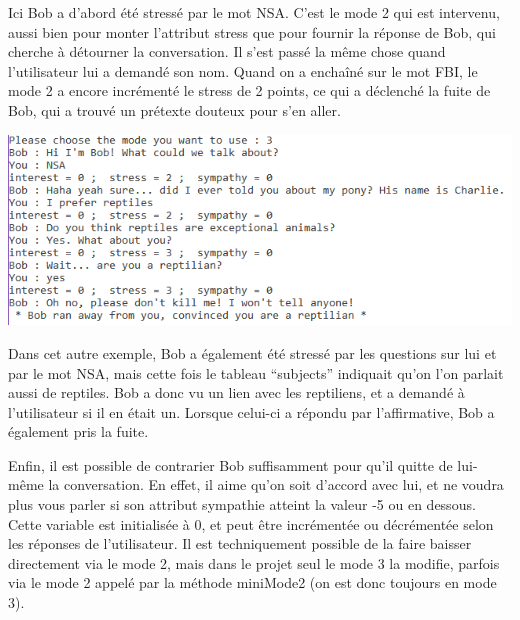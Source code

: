 \documentclass[paper=a4, 12pt]{report}
\begin{document}
\vspace{0.5cm}

Ici Bob a d’abord été stressé par le mot NSA. C’est le mode 2 qui est intervenu, aussi bien pour monter l’attribut stress que pour fournir la réponse de Bob, qui cherche à détourner la conversation. Il s’est passé la même chose quand l’utilisateur lui a demandé son nom. Quand on a enchaîné sur le mot FBI, le mode 2 a encore incrémenté le stress de 2 points, ce qui a déclenché la fuite de Bob, qui a trouvé un prétexte douteux pour s’en aller.

\vspace{0.5cm}

\includegraphics[scale=0.5]{screen4.png}

\vspace{0.5cm}

Dans cet autre exemple, Bob a également été stressé par les questions sur lui et par le mot NSA, mais cette fois le tableau “subjects” indiquait qu’on l’on parlait aussi de reptiles. Bob a donc vu un lien avec les reptiliens, et a demandé à l’utilisateur si il en était un. Lorsque celui-ci a répondu par l’affirmative, Bob a également pris la fuite.

\vspace{0.5cm}

Enfin, il est possible de contrarier Bob suffisamment pour qu’il quitte de lui-même la conversation. En effet, il aime qu’on soit d’accord avec lui, et ne voudra plus vous parler si son attribut sympathie atteint la valeur -5 ou en dessous. Cette variable est initialisée à 0, et peut être incrémentée ou décrémentée selon les réponses de l’utilisateur. Il est techniquement possible de la faire baisser directement via le mode 2, mais dans le projet seul le mode 3 la modifie, parfois via le mode 2 appelé par la méthode miniMode2 (on est donc toujours en mode 3).

\vspace{0.5cm}
\end{document}
